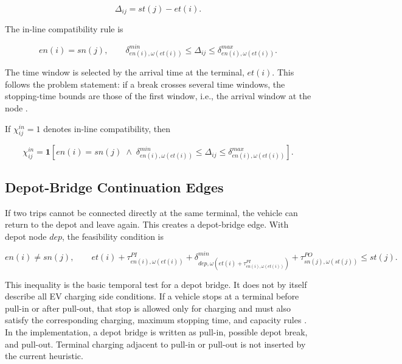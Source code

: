 \begin{equation}
\Delta_{ij}=st(j)-et(i).
\label{eq:inline-stop-duration}
\end{equation}

The in-line compatibility rule is

\begin{equation}
en(i)=sn(j),
\qquad
\delta^{min}_{en(i),\omega(et(i))}
\le
\Delta_{ij}
\le
\delta^{max}_{en(i),\omega(et(i))}.
\label{eq:inline}
\end{equation}

The time window is selected by the arrival time at the terminal, \(et(i)\).
This follows the problem statement: if a break crosses several time windows,
the stopping-time bounds are those of the first window, i.e., the arrival
window at the node \cite{minoa-problem}.

If \(\chi^{in}_{ij}=1\) denotes in-line compatibility, then

\begin{equation}
\chi^{in}_{ij}
=
\mathbf{1}
\left[
en(i)=sn(j)
\;\wedge\;
\delta^{min}_{en(i),\omega(et(i))}
\le \Delta_{ij}\le
\delta^{max}_{en(i),\omega(et(i))}
\right].
\label{eq:inline-indicator}
\end{equation}

\subsection{Depot-Bridge Continuation Edges}

If two trips cannot be connected directly at the same terminal, the vehicle can
return to the depot and leave again. This creates a depot-bridge edge. With
depot node \(dep\), the feasibility condition is

\begin{equation}
en(i)\neq sn(j),
\qquad
et(i)
+\tau^{PI}_{en(i),\omega(et(i))}
+\delta^{min}_{dep,\omega(et(i)+\tau^{PI}_{en(i),\omega(et(i))})}
+\tau^{PO}_{sn(j),\omega(st(j))}
\le
st(j).
\label{eq:depot}
\end{equation}

This inequality is the basic temporal test for a depot bridge. It does not by
itself describe all EV charging side conditions. If a vehicle stops at a
terminal before pull-in or after pull-out, that stop is allowed only for
charging and must also satisfy the corresponding charging, maximum stopping
time, and capacity rules \cite{minoa-problem}. In the implementation, a depot
bridge is written as pull-in, possible depot break, and pull-out. Terminal
charging adjacent to pull-in or pull-out is not inserted by the current
heuristic.

